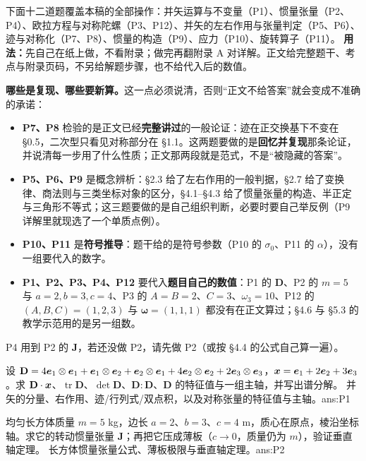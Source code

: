 \documentclass[11pt]{ctexart}
\newcommand{\ten}[1]{\mathbf{#1}}
\newcommand{\tr}{\operatorname{tr}}
\let\orighdr\hdr
\renewcommand{\hdr}[2]{\par\needspace{10\baselineskip}\orighdr{#1}{#2}}
\begin{document}
\label{sec:exercises}

下面十二道题覆盖本稿的全部操作：并矢运算与不变量（P1）、惯量张量（P2、P4）、欧拉方程与对称陀螺（P3、P12）、并矢的左右作用与张量判定（P5、P6）、迹与对称化（P7、P8）、惯量的构造（P9）、应力（P10）、旋转算子（P11）。
\textbf{用法：}先自己在纸上做，不看附录；做完再翻附录 A 对详解。正文给完整题干、考点与附录页码，不另给解题步骤，也不给代入后的数值。
\par\smallskip
\textbf{哪些是复现、哪些要新算。}这一点必须说清，否则“正文不给答案”就会变成不准确的承诺：
\begin{itemize}[leftmargin=1.8em,itemsep=2pt]
\item \textbf{P7、P8} 检验的是正文已经\textbf{完整讲过}的一般论证：迹在正交换基下不变在 \S0.5，二次型只看见对称部分在 \S1.1。这两题要做的是\textbf{回忆并复现}那条论证，并说清每一步用了什么性质；正文那两段就是范式，不是“被隐藏的答案”。
\item \textbf{P5、P6、P9} 是概念辨析：\S2.3 给了左右作用的一般判据，\S2.7 给了变换律、商法则与三类坐标对象的区分，\S4.1--\S4.3 给了惯量张量的构造、半正定与三角形不等式；这三题要做的是自己组织判断，必要时要自己举反例（P9 详解里就现选了一个单质点例）。
\item \textbf{P10、P11} 是\textbf{符号推导}：题干给的是符号参数（P10 的 $\sigma_0$、P11 的 $\alpha$），没有一组要代入的数字。
\item \textbf{P1、P2、P3、P4、P12} 要代入\textbf{题目自己的数值}：P1 的 $\ten D$、P2 的 $m=5$ 与 $a=2,b=3,c=4$、P3 的 $A=B=2$、$C=3$、$\omega_3=10$、P12 的 $(A,B,C)=(1,2,3)$ 与 $\boldsymbol\omega=(1,1,1)$ 都没有在正文算过；\S4.6 与 \S5.3 的教学示范用的是另一组数。
\end{itemize}
P4 用到 P2 的 $\ten J$，若还没做 P2，请先做 P2（或按 \S4.4 的公式自己算一遍）。

{设 $\ten D=4\vect e_1\otimes\vect e_1+\vect e_1\otimes\vect e_2+\vect e_2\otimes\vect e_1+4\vect e_2\otimes\vect e_2+2\vect e_3\otimes\vect e_3$，$\boldsymbol{x}=\boldsymbol{e}_1+2\boldsymbol{e}_2+3\boldsymbol{e}_3$。求 $\ten D\cdot\vect x$、$\tr\ten D$、$\det\ten D$、$\ten D:\ten D$、$\ten D$ 的特征值与一组主轴，并写出谱分解。}
{并矢的分量、右作用、迹/行列式/双点积，以及对称张量的特征值与主轴。}{ans:P1}

{均匀长方体质量 $m=5$ kg，边长 $a=2$、$b=3$、$c=4$ m，质心在原点，棱沿坐标轴。求它的转动惯量张量 $\ten J$；再把它压成薄板（$c\to0$，质量仍为 $m$），验证垂直轴定理。}
{长方体惯量张量公式、薄板极限与垂直轴定理。}{ans:P2}
\end{document}
